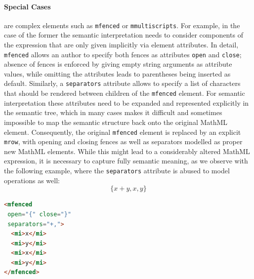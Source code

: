 \documentclass{llncs}
\begin{document}
\paragraph{Special Cases} are complex elements such as \texttt{mfenced} or
\texttt{mmultiscripts}. For example, in the case of the former the semantic
interpretation needs to consider components of the expression that are only
given implicitly via element attributes. In detail, \texttt{mfenced} allows an author to
specify both fences as attributes \texttt{open} and \texttt{close}; absence of
fences is enforced by giving empty string arguments as attribute values, while
omitting the attributes leads to parentheses being inserted as
default. Similarly, a \texttt{separators} attribute allows to specify a list of
characters that should be rendered between children of the \texttt{mfenced} element. For
semantic interpretation these attributes need to be expanded and represented
explicitly in the semantic tree, which in many cases makes it difficult and
sometimes impossible to map the semantic structure back onto the original MathML
element.  Consequently, the original \texttt{mfenced} element is replaced by an explicit
\texttt{mrow}, with opening and closing fences as well as separators modelled 
as proper
new MathML elements. While this might lead to a considerably altered MathML
expression, it is necessary to capture fully semantic meaning, as we observe
with the following example, where the \texttt{separators} attribute is abused to
model operations as well:
\[\{x+y,x,y\}\]

\begin{minipage}{0.2\textwidth}\footnotesize
\begin{lstlisting}[language=html]
<mfenced
 open="{" close="}"
 separators="+,">
  <mi>x</mi>
  <mi>y</mi>
  <mi>x</mi>
  <mi>y</mi>
</mfenced>
\end{lstlisting}
\end{minipage}
\begin{minipage}{0.4\textwidth}
\qquad
{}
\end{minipage}
\end{document}

